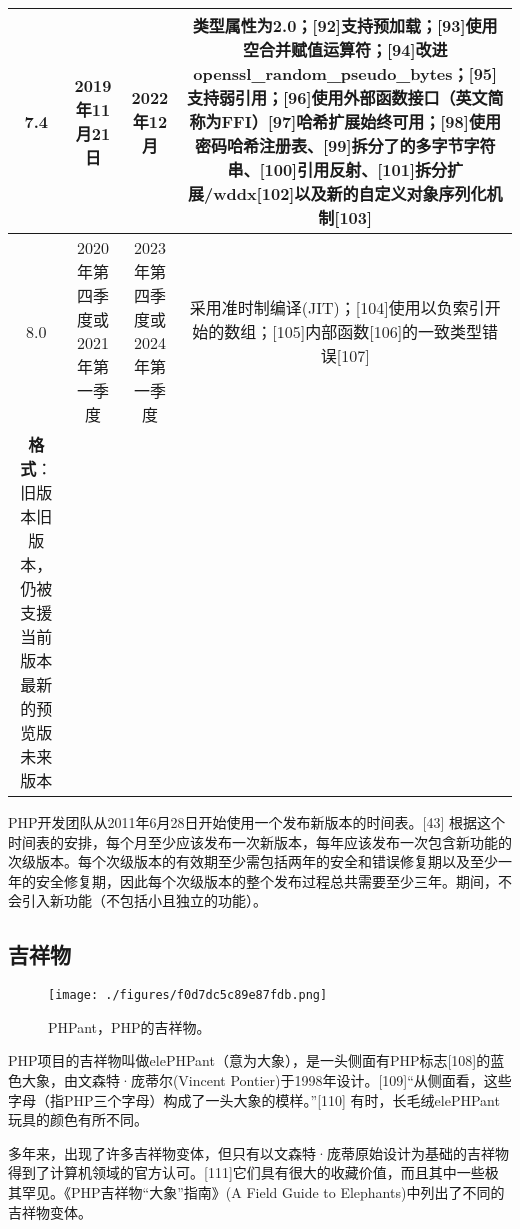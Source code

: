 \begin{table}[ht]
\begin{tabular}{|c|c|c|c}
\hline
7.4 & 2019年11月21日 & 2022年12月 & 类型属性为2.0；[92]支持预加载；[93]使用空合并赋值运算符；[94]改进openssl_random_pseudo_bytes；[95]支持弱引用；[96]使用外部函数接口（英文简称为FFI）[97]哈希扩展始终可用；[98]使用密码哈希注册表、[99]拆分了的多字节字符串、[100]引用反射、[101]拆分扩展/wddx[102]以及新的自定义对象序列化机制[103]\\
\hline
8.0 & 2020年第四季度或2021年第一季度 & 2023年第四季度或2024年第一季度 & 采用准时制编译(JIT)；[104]使用以负索引开始的数组；[105]内部函数[106]的一致类型错误[107]\\
\hline
\textbf{格式}：旧版本旧版本，仍被支援当前版本最新的预览版未来版本 &  &  & \\
\hline
\end{tabular}
\end{table}
PHP开发团队从2011年6月28日开始使用一个发布新版本的时间表。[43] 根据这个时间表的安排，每个月至少应该发布一次新版本，每年应该发布一次包含新功能的次级版本。每个次级版本的有效期至少需包括两年的安全和错误修复期以及至少一年的安全修复期，因此每个次级版本的整个发布过程总共需要至少三年。期间，不会引入新功能（不包括小且独立的功能）。

\subsection{吉祥物}
\begin{figure}[ht]
\centering
\texttt{[image: ./figures/f0d7dc5c89e87fdb.png]}
\caption{PHPant，PHP的吉祥物。} \label{fig_PHP_5}
\end{figure}

PHP项目的吉祥物叫做elePHPant（意为大象），是一头侧面有PHP标志[108]的蓝色大象，由文森特·庞蒂尔(Vincent Pontier)于1998年设计。[109]“从侧面看，这些字母（指PHP三个字母）构成了一头大象的模样。”[110] 有时，长毛绒elePHPant玩具的颜色有所不同。

多年来，出现了许多吉祥物变体，但只有以文森特·庞蒂原始设计为基础的吉祥物得到了计算机领域的官方认可。[111]它们具有很大的收藏价值，而且其中一些极其罕见。《PHP吉祥物“大象”指南》(A Field Guide to Elephants)中列出了不同的吉祥物变体。

